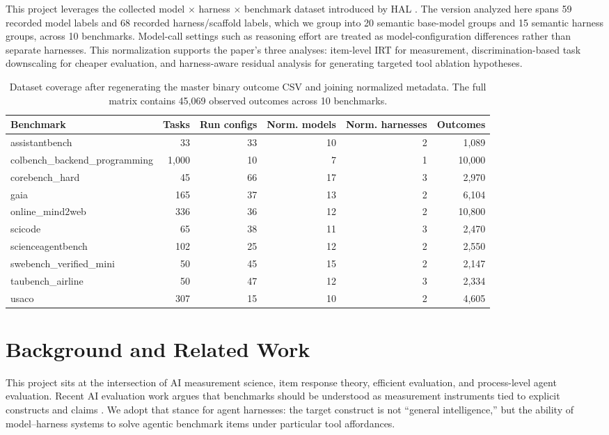 \documentclass{article}
\begin{document}
This project leverages the collected model $\times$ harness $\times$ benchmark dataset introduced by HAL \citep{hal2026}. The version analyzed here spans 59 recorded model labels and 68 recorded harness/scaffold labels, which we group into 20 semantic base-model groups and 15 semantic harness groups, across 10 benchmarks. Model-call settings such as reasoning effort are treated as model-configuration differences rather than separate harnesses. This normalization supports the paper's three analyses: item-level IRT for measurement, discrimination-based task downscaling for cheaper evaluation, and harness-aware residual analysis for generating targeted tool ablation hypotheses.

\begin{table}[t]
\centering
\small
\setlength{\tabcolsep}{4pt}
\begin{tabular}{lrrrrr}
\toprule
Benchmark & Tasks & Run configs & Norm. models & Norm. harnesses & Outcomes \\
\midrule
assistantbench & 33 & 33 & 10 & 2 & 1{,}089 \\
colbench\_backend\_programming & 1{,}000 & 10 & 7 & 1 & 10{,}000 \\
corebench\_hard & 45 & 66 & 17 & 3 & 2{,}970 \\
gaia & 165 & 37 & 13 & 2 & 6{,}104 \\
online\_mind2web & 336 & 36 & 12 & 2 & 10{,}800 \\
scicode & 65 & 38 & 11 & 3 & 2{,}470 \\
scienceagentbench & 102 & 25 & 12 & 2 & 2{,}550 \\
swebench\_verified\_mini & 50 & 45 & 15 & 2 & 2{,}147 \\
taubench\_airline & 50 & 47 & 12 & 3 & 2{,}334 \\
usaco & 307 & 15 & 10 & 2 & 4{,}605 \\
\bottomrule
\end{tabular}
\caption{Dataset coverage after regenerating the master binary outcome CSV and joining normalized metadata. The full matrix contains 45{,}069 observed outcomes across 10 benchmarks.}
\label{tab:dataset-coverage}
\end{table}

\section{Background and Related Work}

This project sits at the intersection of AI measurement science, item response theory, efficient evaluation, and process-level agent evaluation. Recent AI evaluation work argues that benchmarks should be understood as measurement instruments tied to explicit constructs and claims \citep{wallach2025socialmeasurement,salaudeen2025measurement,sun2025beyondbenchmarks}. We adopt that stance for agent harnesses: the target construct is not ``general intelligence,'' but the ability of model--harness systems to solve agentic benchmark items under particular tool affordances.
\end{document}
